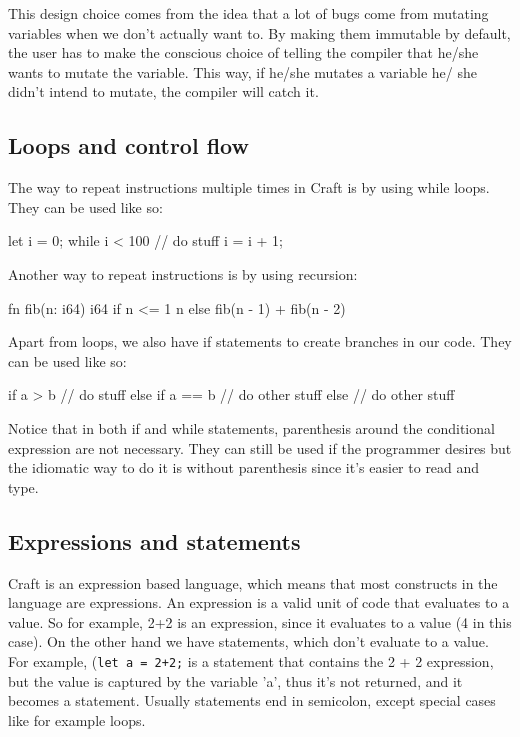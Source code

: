 ﻿\documentclass[10pt,a4paper,twocolumn,twoside]{article}
\begin{document}
This design choice comes from the idea that a lot of bugs come from 
mutating variables when we don't actually want to. By making them immutable by
default, the user has to make the conscious choice of telling the compiler that
he/she wants to mutate the variable. This way, if he/she mutates a variable he/
she didn't intend to mutate, the compiler will catch it.

\subsection{Loops and control flow}
The way to repeat instructions multiple times in Craft is by using while loops.
They can be used like so:
\begin{code}
    let i = 0;
    while i < 100 {
        // do stuff
        i = i + 1;
    }
\end{code}

Another way to repeat instructions is by using recursion:
\begin{code}
fn fib(n: i64) i64 {
    if n <= 1 {
        n
    } else {
        fib(n - 1) + fib(n - 2)
    }
}
\end{code}

Apart from loops, we also have if statements to create branches in our code. 
They can be used like so:

\begin{code}
    if a > b {
        // do stuff
    } else if a == b {
        // do other stuff
    } else {
        // do other stuff
    }
\end{code}

Notice that in both if and while statements, parenthesis around the conditional 
expression are not necessary. They can still be used if the programmer desires
but the idiomatic way to do it is without parenthesis since it's easier to read 
and type.

\subsection{Expressions and statements}
Craft is an expression based language, which means that most constructs in the
language are expressions. An expression is a valid unit of code that evaluates
to a value. So for example, 2+2 is an expression, since it evaluates to a value
(4 in this case). On the other hand we have statements, which don't evaluate to
a value. For example, (\texttt{let a = 2+2;} is a statement that contains the 2
+ 2 expression, but the value is captured by the variable 'a', thus it's not
returned, and it becomes a statement. Usually statements end in semicolon,
except special cases like for example loops.
\end{document}
